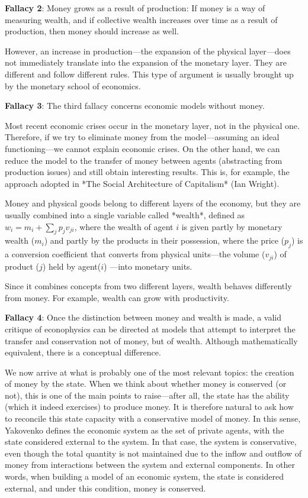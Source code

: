 \textbf{Fallacy 2}: Money grows as a result of production: If money is a way of measuring wealth, and if collective wealth increases over time as a result of production, then money should increase as well.

However, an increase in production—the expansion of the physical layer—does not immediately translate into the expansion of the monetary layer. They are different and follow different rules. This type of argument is usually brought up by the monetary school of economics.


\textbf{Fallacy 3}: The third fallacy concerns economic models without money.

Most recent economic crises occur in the monetary layer, not in the physical one. Therefore, if we try to eliminate money from the model—assuming an ideal functioning—we cannot explain economic crises. On the other hand, we can reduce the model to the transfer of money between agents (abstracting from production issues) and still obtain interesting results. This is, for example, the approach adopted in *The Social Architecture of Capitalism* (Ian Wright).

Money and physical goods belong to different layers of the economy, but they are usually combined into a single variable called *wealth*, defined as   $w_i = m_i + \sum_{j} p_j v_{ji}$, where the wealth of agent \(i\) is given partly by monetary wealth ($m_i$) and partly by the products in their possession, where the price ($p_j$) is a conversion coefficient that converts from physical units—the volume ($v_{ji}$) of product ($j$) held by agent($i$) —into monetary units.

Since it combines concepts from two different layers, wealth behaves differently from money. For example, wealth can grow with productivity.


\textbf{Fallacy 4}: Once the distinction between money and wealth is made, a valid critique of econophysics can be directed at models that attempt to interpret the transfer and conservation not of money, but of wealth. Although mathematically equivalent, there is a conceptual difference.

We now arrive at what is probably one of the most relevant topics: the creation of money by the state. When we think about whether money is conserved (or not), this is one of the main points to raise—after all, the state has the ability (which it indeed exercises) to produce money. It is therefore natural to ask how to reconcile this state capacity with a conservative model of money. In this sense, Yakovenko defines the economic system as the set of private agents, with the state considered external to the system. In that case, the system is conservative, even though the total quantity is not maintained due to the inflow and outflow of money from interactions between the system and external components. In other words, when building a model of an economic system, the state is considered external, and under this condition, money is conserved.

